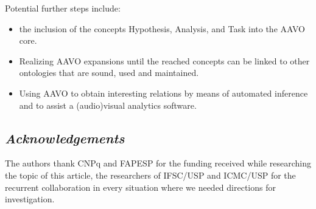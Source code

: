 \documentclass[12pt,fleqn]{article}
\begin{document}
Potential further steps include:
\begin{itemize}
	\item the inclusion of the concepts Hypothesis, Analysis, and Task
		into the AAVO core.
	\item Realizing AAVO expansions until the reached concepts can be linked
		to other ontologies that are sound, used and maintained.
	\item Using AAVO to obtain interesting relations by means of automated
		inference and to assist a (audio)visual analytics software.
\end{itemize}



\subsection*{\textit{Acknowledgements}}
The authors thank CNPq and FAPESP for the funding received while researching the topic of this article, the researchers of IFSC/USP and ICMC/USP for the recurrent collaboration in every situation
where we needed directions for investigation.
\end{document}
